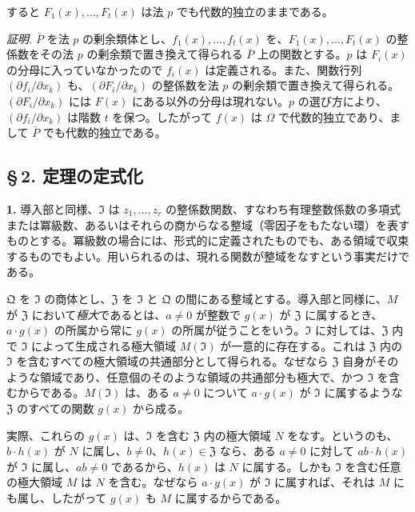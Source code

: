 すると $F_1(x),\ldots,F_t(x)$ は法 $p$ でも代数的独立のままである。

\noindent\emph{証明.}
$\bar P$ を法 $p$ の剰余類体とし、$f_1(x),\ldots,f_t(x)$ を、$F_1(x),\ldots,F_t(x)$ の整係数をその法 $p$ の剰余類で置き換えて得られる $\bar P$ 上の関数とする。$p$ は $F_i(x)$ の分母に入っていなかったので $f_i(x)$ は定義される。また、関数行列 $(\partial f_i/\partial x_k)$ も、$(\partial F_i/\partial x_k)$ の整係数を法 $p$ の剰余類で置き換えて得られる。$(\partial F_i/\partial x_k)$ には $F(x)$ にある以外の分母は現れない。$p$ の選び方により、$(\partial f_i/\partial x_k)$ は階数 $t$ を保つ。したがって $f(x)$ は $\Omega$ で代数的独立であり、まして $\bar P$ でも代数的独立である。

\subsection*{\S\,2. 定理の定式化}

\noindent\textbf{1.}
導入部と同様、$\mathfrak{I}$ は $z_1,\ldots,z_r$ の整係数関数、すなわち有理整数係数の多項式または冪級数、あるいはそれらの商からなる整域（零因子をもたない環）を表すものとする。冪級数の場合には、形式的に定義されたものでも、ある領域で収束するものでもよい。用いられるのは、現れる関数が整域をなすという事実だけである。

$\mathfrak{Q}$ を $\mathfrak{I}$ の商体とし、$\mathfrak{Z}$ を $\mathfrak{I}$ と $\mathfrak{Q}$ の間にある整域とする。導入部と同様に、$M$ が $\mathfrak{Z}$ において\emph{極大}であるとは、$a\ne0$ が整数で $g(x)$ が $\mathfrak{Z}$ に属するとき、$a\cdot g(x)$ の所属から常に $g(x)$ の所属が従うことをいう。$\mathfrak{I}$ に対しては、$\mathfrak{Z}$ 内で $\mathfrak{I}$ によって生成される極大領域 $M(\mathfrak{I})$ が一意的に存在する。これは $\mathfrak{Z}$ 内の $\mathfrak{I}$ を含むすべての極大領域の共通部分として得られる。なぜなら $\mathfrak{Z}$ 自身がそのような領域であり、任意個のそのような領域の共通部分も極大で、かつ $\mathfrak{I}$ を含むからである。$M(\mathfrak{I})$ は、ある $a\ne0$ について $a\cdot g(x)$ が $\mathfrak{I}$ に属するような $\mathfrak{Z}$ のすべての関数 $g(x)$ から成る。

実際、これらの $g(x)$ は、$\mathfrak{I}$ を含む $\mathfrak{Z}$ 内の極大領域 $N$ をなす。というのも、$b\cdot h(x)$ が $N$ に属し、$b\ne0$、$h(x)\in\mathfrak{Z}$ なら、ある $a\ne0$ に対して $ab\cdot h(x)$ が $\mathfrak{I}$ に属し、$ab\ne0$ であるから、$h(x)$ は $N$ に属する。しかも $\mathfrak{I}$ を含む任意の極大領域 $M$ は $N$ を含む。なぜなら $a\cdot g(x)$ が $\mathfrak{I}$ に属すれば、それは $M$ にも属し、したがって $g(x)$ も $M$ に属するからである。

